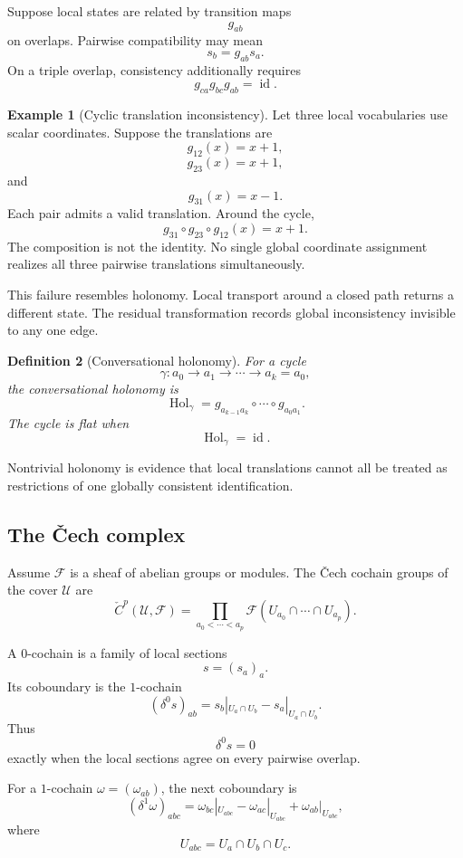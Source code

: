 \documentclass[11pt]{article}
\newtheorem{definition}{Definition}[section]
\theoremstyle{definition}
\newtheorem{example}[definition]{Example}
\begin{document}
Suppose local states are related by transition maps
\[
g_{ab}
\]
on overlaps. Pairwise compatibility may mean
\[
s_b
=
g_{ab}s_a.
\]
On a triple overlap, consistency additionally requires
\[
g_{ca}g_{bc}g_{ab}
=
\operatorname{id}.
\]

\begin{example}[Cyclic translation inconsistency]
Let three local vocabularies use scalar coordinates. Suppose the translations are
\[
g_{12}(x)=x+1,
\]
\[
g_{23}(x)=x+1,
\]
and
\[
g_{31}(x)=x-1.
\]
Each pair admits a valid translation. Around the cycle,
\[
g_{31}\circ g_{23}\circ g_{12}(x)
=
x+1.
\]
The composition is not the identity. No single global coordinate assignment realizes all three pairwise translations simultaneously.
\end{example}

This failure resembles holonomy. Local transport around a closed path returns a different state. The residual transformation records global inconsistency invisible to any one edge.

\begin{definition}[Conversational holonomy]
For a cycle
\[
\gamma:
a_0\to a_1\to\cdots\to a_k=a_0,
\]
the conversational holonomy is
\[
\operatorname{Hol}_{\gamma}
=
g_{a_{k-1}a_k}
\circ\cdots\circ
g_{a_0a_1}.
\]
The cycle is flat when
\[
\operatorname{Hol}_{\gamma}
=
\operatorname{id}.
\]
\end{definition}

Nontrivial holonomy is evidence that local translations cannot all be treated as restrictions of one globally consistent identification.

\subsection{The Čech complex}

Assume \(\mathscr F\) is a sheaf of abelian groups or modules. The Čech cochain groups of the cover \(\mathcal U\) are
\[
\check C^p(\mathcal U,\mathscr F)
=
\prod_{a_0<\cdots<a_p}
\mathscr F
\left(
U_{a_0}\cap\cdots\cap U_{a_p}
\right).
\]

A \(0\)-cochain is a family of local sections
\[
s=(s_a)_a.
\]
Its coboundary is the \(1\)-cochain
\[
(\delta^0s)_{ab}
=
s_b|_{U_a\cap U_b}
-
s_a|_{U_a\cap U_b}.
\]
Thus
\[
\delta^0s=0
\]
exactly when the local sections agree on every pairwise overlap.

For a \(1\)-cochain \(\omega=(\omega_{ab})\), the next coboundary is
\[
(\delta^1\omega)_{abc}
=
\omega_{bc}|_{U_{abc}}
-
\omega_{ac}|_{U_{abc}}
+
\omega_{ab}|_{U_{abc}},
\]
where
\[
U_{abc}
=
U_a\cap U_b\cap U_c.
\]
\end{document}
